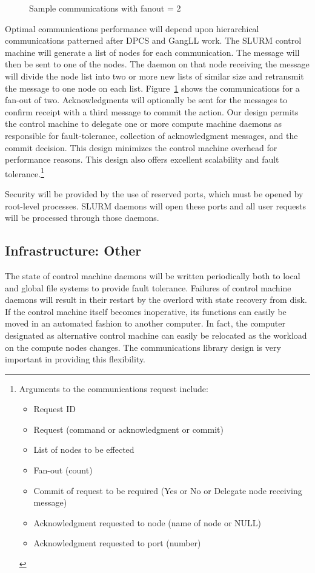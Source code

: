 \begin{figure}[htb]
\centerline{}
\caption{Sample communications with fanout = 2}
\label{communicate}
\end{figure}
Optimal communications performance will depend upon hierarchical communications
patterned after DPCS and GangLL work. The SLURM control machine will generate a
list of nodes for each communication. The message will then be sent to one of
the nodes. 
The daemon on that node receiving the message will divide the node list into
two or more new lists of similar size and retransmit the message to one node on
each list. Figure~\ref{communicate} shows the communications for a fan-out of 
two.  Acknowledgments will optionally be sent for the messages to confirm 
receipt with a third message to commit the action. Our design permits the 
control machine to delegate one or more compute machine daemons as responsible 
for fault-tolerance, collection of acknowledgment messages, and the commit
decision. This design minimizes the control machine overhead for performance
reasons. This design also offers excellent scalability and fault 
tolerance.\footnote{Arguments to the communications request include:
\begin{itemize}
\item Request ID
\item Request (command or acknowledgment or commit)
\item List of nodes to be effected
\item Fan-out (count)
\item Commit of request to be required (Yes or No or Delegate node receiving
      message) 
\item Acknowledgment requested to node (name of node or NULL)
\item Acknowledgment requested to port (number)
\end{itemize} }

Security will be provided by the use of reserved ports, which must be opened by
root-level processes. SLURM daemons will open these ports and all user requests
will be processed through those daemons. 

\subsection{Infrastructure: Other}

The state of control machine daemons will be written periodically both to local
and global file systems to provide fault tolerance. Failures of control machine
daemons will result in their restart by the overlord with state recovery from
disk. If the control machine itself becomes inoperative, its functions can
easily be moved in an automated fashion to another computer. In fact, the
computer designated as alternative control machine can easily be relocated as
the workload on the compute nodes changes. The communications library design is
very important in providing this flexibility.

